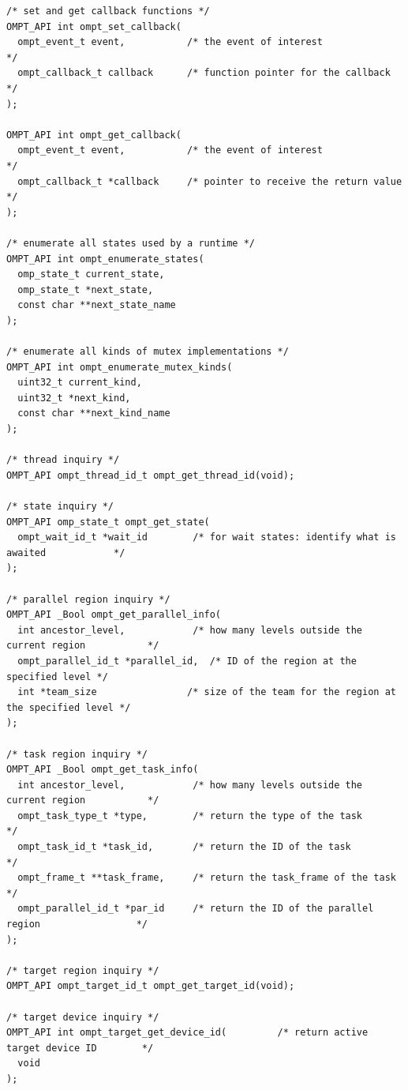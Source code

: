 \documentclass{article}
\begin{document}
{%
\begin{verbatim}
/* set and get callback functions */
OMPT_API int ompt_set_callback( 
  ompt_event_t event,           /* the event of interest                                 */
  ompt_callback_t callback      /* function pointer for the callback                     */
);

OMPT_API int ompt_get_callback(
  ompt_event_t event,           /* the event of interest                                 */
  ompt_callback_t *callback     /* pointer to receive the return value                   */
);

/* enumerate all states used by a runtime */
OMPT_API int ompt_enumerate_states(  
  omp_state_t current_state,   
  omp_state_t *next_state,     
  const char **next_state_name   
);

/* enumerate all kinds of mutex implementations */
OMPT_API int ompt_enumerate_mutex_kinds(  
  uint32_t current_kind, 
  uint32_t *next_kind,   
  const char **next_kind_name    
);

/* thread inquiry */
OMPT_API ompt_thread_id_t ompt_get_thread_id(void);

/* state inquiry */
OMPT_API omp_state_t ompt_get_state( 
  ompt_wait_id_t *wait_id        /* for wait states: identify what is awaited            */
);

/* parallel region inquiry */
OMPT_API _Bool ompt_get_parallel_info(
  int ancestor_level,            /* how many levels outside the current region           */
  ompt_parallel_id_t *parallel_id,  /* ID of the region at the specified level */
  int *team_size                /* size of the team for the region at the specified level */
);

/* task region inquiry */
OMPT_API _Bool ompt_get_task_info(
  int ancestor_level,            /* how many levels outside the current region           */
  ompt_task_type_t *type,        /* return the type of the task                          */
  ompt_task_id_t *task_id,       /* return the ID of the task                            */
  ompt_frame_t **task_frame,     /* return the task_frame of the task                    */
  ompt_parallel_id_t *par_id     /* return the ID of the parallel region                 */
);

/* target region inquiry */
OMPT_API ompt_target_id_t ompt_get_target_id(void);

/* target device inquiry */
OMPT_API int ompt_target_get_device_id(         /* return active target device ID        */
  void
);


\end{verbatim}}
\end{document}
